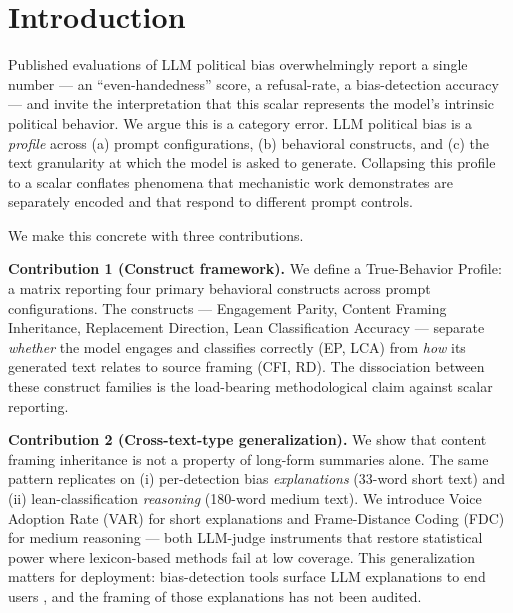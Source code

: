 \documentclass{article}
\begin{document}
\section{Introduction}

Published evaluations of LLM political bias overwhelmingly report a single number — an ``even-handedness'' score, a refusal-rate, a bias-detection accuracy — and invite the interpretation that this scalar represents the model's intrinsic political behavior. We argue this is a category error. LLM political bias is a \emph{profile} across (a) prompt configurations, (b) behavioral constructs, and (c) the text granularity at which the model is asked to generate. Collapsing this profile to a scalar conflates phenomena that mechanistic work demonstrates are separately encoded \citep{arditi2024refusal, zhao2025} and that respond to different prompt controls.

We make this concrete with three contributions.

\textbf{Contribution 1 (Construct framework).} We define a True-Behavior Profile: a matrix reporting four primary behavioral constructs across prompt configurations. The constructs — Engagement Parity, Content Framing Inheritance, Replacement Direction, Lean Classification Accuracy — separate \emph{whether} the model engages and classifies correctly (EP, LCA) from \emph{how} its generated text relates to source framing (CFI, RD). The dissociation between these construct families is the load-bearing methodological claim against scalar reporting.

\textbf{Contribution 2 (Cross-text-type generalization).} We show that content framing inheritance is not a property of long-form summaries alone. The same pattern replicates on (i) per-detection bias \emph{explanations} (33-word short text) and (ii) lean-classification \emph{reasoning} (180-word medium text). We introduce Voice Adoption Rate (VAR) for short explanations and Frame-Distance Coding (FDC) for medium reasoning — both LLM-judge instruments that restore statistical power where lexicon-based methods fail at low coverage. This generalization matters for deployment: bias-detection tools surface LLM explanations to end users \citep{biaslab2024, mediabiasdetector2025}, and the framing of those explanations has not been audited.
\end{document}
